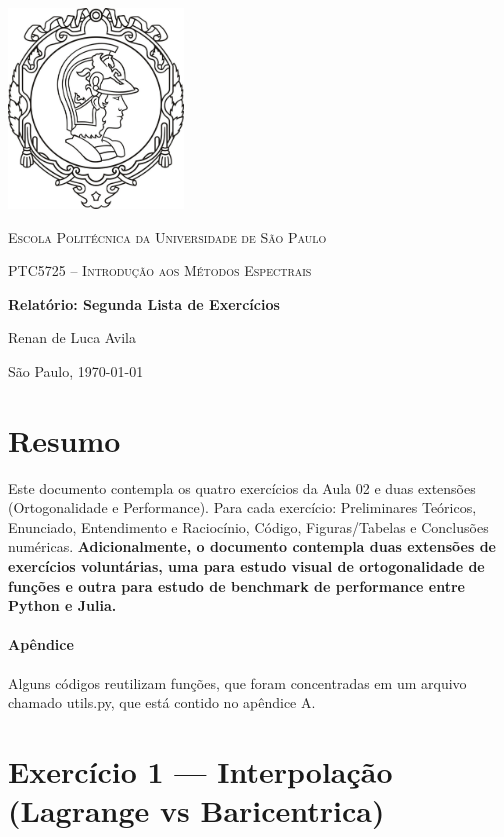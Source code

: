 \documentclass[11pt,a4paper]{article}
\begin{document}
\begin{titlepage}
    \centering
    \vspace*{0.5cm}
    \includegraphics[width=0.35\textwidth]{EP.jpg}\par\vspace{1cm}
    {\scshape\LARGE Escola Politécnica da Universidade de São Paulo \par}
    \vspace{1.2cm}
    {\scshape\Large PTC5725 -- Introdução aos Métodos Espectrais \par}
    \vspace{2.0cm}
    {\huge\bfseries Relatório: Segunda Lista de Exercícios\par}
    \vspace{2.0cm}
    {\Large Renan de Luca Avila\par}
    \vfill
    São Paulo, \today
\end{titlepage}

\section*{Resumo}
Este documento contempla os quatro exercícios da Aula 02 e duas extensões (Ortogonalidade e Performance). Para cada exercício: Preliminares Teóricos, Enunciado, Entendimento e Raciocínio, Código, Figuras/Tabelas e Conclusões numéricas. \textbf{Adicionalmente, o documento contempla duas extensões de exercícios voluntárias, uma para estudo visual de ortogonalidade de funções e outra para estudo de benchmark de performance entre Python e Julia.}
\paragraph{Apêndice} Alguns códigos reutilizam funções, que foram concentradas em um arquivo chamado utils.py, que está contido no apêndice A. 

\section{Exercício 1 --- Interpolação (Lagrange vs Baricentrica)}
\end{document}
